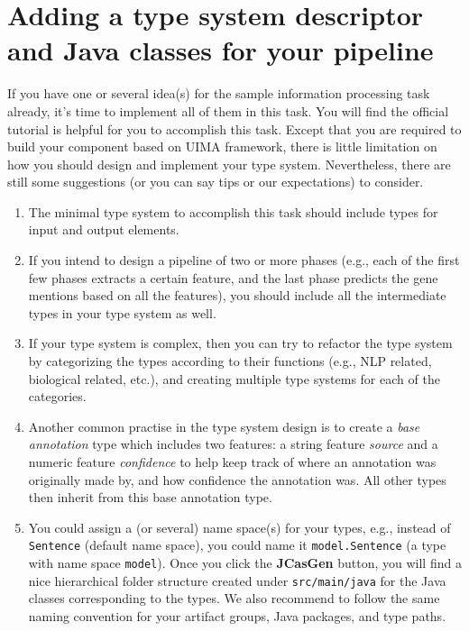 
\section{Adding a type system descriptor and Java classes for your pipeline}

If you have one or several idea(s) for the sample information processing task
already, it's time to implement all of them in this task. You will find the
official tutorial is helpful for you to accomplish this task. Except that you
are required to build your component based on UIMA framework, there is little
limitation on how you should design and implement your type system.
Nevertheless, there are still some suggestions (or you can say tips or our
expectations) to consider.

\begin{enumerate}

\item The minimal type system to accomplish this task should include types for
input and output elements.

\item If you intend to design a pipeline of two or more phases (e.g., each of
the first few phases extracts a certain feature, and the last phase predicts the
gene mentions based on all the features), you should include all the
intermediate types in your type system as well.

\item If your type system is complex, then you can try to refactor the type
system by categorizing the types according to their functions (e.g., NLP
related, biological related, etc.), and creating multiple type systems for each
of the categories.

\item Another common practise in the type system design is to create a
\emph{base annotation} type which includes two features: a string feature
\emph{source} and a numeric feature \emph{confidence} to help keep track of
where an annotation was originally made by, and how confidence the annotation
was. All other types then inherit from this base annotation type.

\item You could assign a (or several) name space(s) for your types, e.g.,
instead of \texttt{Sentence} (default name space), you could name it
\texttt{model.Sentence} (a type with name space \texttt{model}). Once you click
the \textbf{JCasGen} button, you will find a nice hierarchical folder structure
created under \texttt{src/main/java} for the Java classes corresponding to the
types. We also recommend to follow the same naming convention for your artifact
groups, Java packages, and type paths.

\end{enumerate}